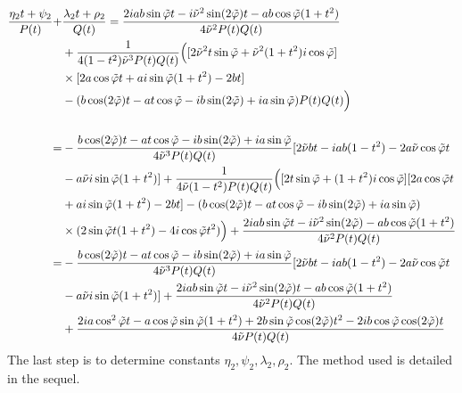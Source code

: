 \begin{equation}
\begin{split}
\frac{\eta_2 t+\psi_2}{P(t)}+&\frac{\lambda_2 t +\rho_2}{Q(t)}
=\frac{2iab\sin\tilde{\varphi}t-i\tilde{\nu}^2\sin(2\tilde{\varphi})t-ab\cos\tilde{\varphi}(1+t^2)}{4\tilde{\nu}^2P(t)Q(t)}\\
&+\frac{1}{4(1-t^2)\tilde{\nu}^3P(t)Q(t)}\Big( \lbrack 2\tilde{\nu}^2t\sin\tilde{\varphi}+\tilde{\nu}^2(1+t^2)i\cos\tilde{\varphi} \rbrack\\
&\times\lbrack 2a\cos\tilde{\varphi}t+ai\sin\tilde{\varphi}(1+t^2)-2bt \rbrack\\
&-(b\cos(2\tilde{\varphi})t-at\cos\tilde{\varphi}-ib\sin(2\tilde{\varphi})+ia\sin\tilde{\varphi})P(t)Q(t)\Big) \\
~\\
=&-\frac{b\cos(2\tilde{\varphi})t-at\cos\tilde{\varphi}-ib\sin(2\tilde{\varphi})+ia\sin\tilde{\varphi}}{4\tilde{\nu}^3P(t)Q(t)}\lbrack 2\tilde{\nu} bt-iab(1-t^2)-2a\tilde{\nu}\cos\tilde{\varphi}t\\
&-a\tilde{\nu} i\sin\tilde{\varphi}(1+t^2)\rbrack +\frac{1}{4\tilde{\nu}(1-t^2)P(t)Q(t)}\Big( \lbrack 2t\sin\tilde{\varphi}+(1+t^2)i\cos\tilde{\varphi} \rbrack\lbrack 2a\cos\tilde{\varphi}t\\
&+ai\sin\tilde{\varphi}(1+t^2)-2bt \rbrack- (b\cos(2\tilde{\varphi})t-at\cos\tilde{\varphi}-ib\sin(2\tilde{\varphi})+ia\sin\tilde{\varphi})\\
&\times(2\sin\tilde{\varphi}t(1+t^2)-4i\cos\tilde{\varphi}t^2) \Big)+\frac{2iab\sin\tilde{\varphi}t-i\tilde{\nu}^2\sin(2\tilde{\varphi})-ab\cos\tilde{\varphi}(1+t^2)}{4\tilde{\nu}^2P(t)Q(t)}\\
=&-\frac{b\cos(2\tilde{\varphi})t-at\cos\tilde{\varphi}-ib\sin(2\tilde{\varphi})+ia\sin\tilde{\varphi}}{4\tilde{\nu}^3P(t)Q(t)}\lbrack 2\tilde{\nu} bt-iab(1-t^2)-2a\tilde{\nu}\cos\tilde{\varphi}t\\
&-a\tilde{\nu} i\sin\tilde{\varphi}(1+t^2)\rbrack+\frac{2iab\sin\tilde{\varphi}t-i\tilde{\nu}^2\sin(2\tilde{\varphi})t-ab\cos\tilde{\varphi}(1+t^2)}{4\tilde{\nu}^2P(t)Q(t)}\\
&+\frac{2ia\cos^2\tilde{\varphi}t-a\cos\tilde{\varphi}\sin\tilde{\varphi}(1+t^2)+2b\sin\tilde{\varphi}\cos(2\tilde{\varphi})t^2-2ib\cos\tilde{\varphi}\cos(2\tilde{\varphi})t}{4\tilde{\nu} P(t)Q(t)}
\end{split}
\label{N2}
\end{equation}
The last step is to determine constants $\eta_2,\psi_2,\lambda_2,\rho_2$. The method used is detailed in the sequel.


